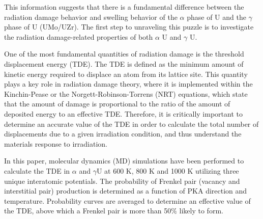 \documentclass[review]{elsarticle}
\begin{document}
This information suggests that there is a fundamental difference between the radiation damage behavior and swelling behavior of the $\alpha$ phase of U and the $\gamma$ phase of U (UMo/UZr). The first step to unraveling this puzzle is to investigate the radiation damage-related properties of both $\alpha$ U and $\gamma$ U.

One of the most fundamental quantities of radiation damage is the threshold displacement energy (TDE). The TDE is defined as the minimum amount of kinetic energy required to displace an atom from its lattice site. This quantity plays a key role in radiation damage theory, where it is implemented within the Kinchin-Pease \cite{kinchinpease} or the Norgett-Robinson-Torrens (NRT) \cite{norgett1975} equations, which state that the amount of damage is proportional to the ratio of the amount of deposited energy to an effective TDE. Therefore, it is critically important to determine an accurate value of the TDE in order to calculate the total number of displacements due to a given irradiation condition, and thus understand the materials response to irradiation.

In this paper, molecular dynamics (MD) simulations have been performed to calculate the TDE in $\alpha$ and $\gamma$U at 600 K, 800 K and 1000 K utilizing three unique interatomic potentials. The probability of Frenkel pair (vacancy and interstitial pair) production is determined as a function of PKA direction and temperature. Probability curves are averaged to determine an effective value of the TDE, above which a Frenkel pair is more than 50$\%$ likely to form. 
\end{document}
